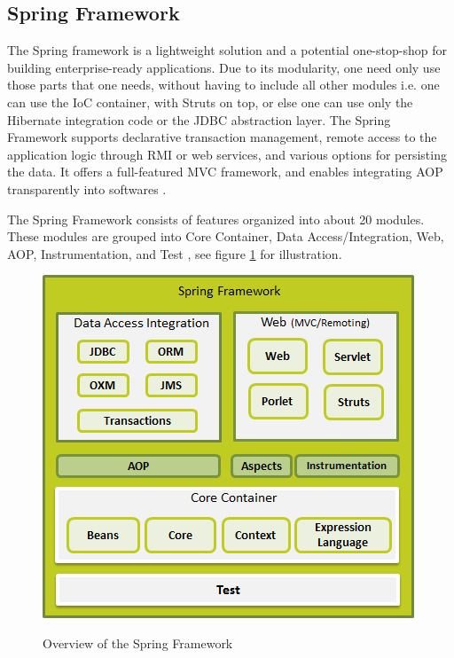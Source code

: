\subsection{Spring Framework\label{sec:back_sp_fr}}
The Spring framework is a lightweight solution and a potential one-stop-shop for building enterprise-ready applications. Due to its modularity, one need only use those parts that one needs, without having to include all other modules i.e. one can use the IoC container, with Struts on top, or else one can use only the Hibernate integration code or the \ac{JDBC} abstraction layer. The Spring Framework supports declarative transaction management, remote access to the application logic through \ac{RMI} or web services, and various options for persisting the data. It offers a full-featured \ac{MVC} framework, and enables integrating \ac{AOP} transparently into  softwares \cite{spring-framework-reference}.


The Spring Framework consists of features organized into about 20 modules. These modules are grouped into Core Container, Data Access/Integration, Web, \ac{AOP}, Instrumentation, and Test \cite{spring-framework-reference}, see figure \ref{fig:spring_arch} for illustration.


\begin{figure}[htb]
  \centering
  \includegraphics[scale=0.6]{spring_architecture.png}\\
  \caption{Overview of the Spring Framework}
  \label{fig:spring_arch}
  \protect\cite{spring-framework-reference}
\end{figure}




